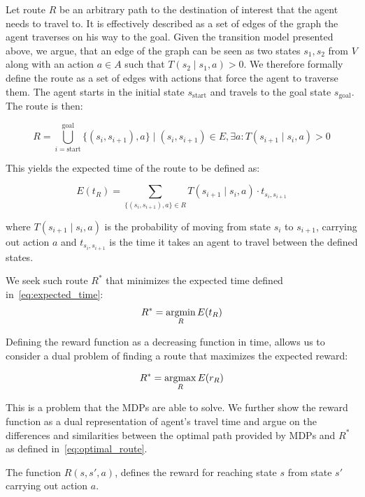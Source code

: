 Let route $R$ be an arbitrary path to the destination of interest that the
agent needs to travel to. It is effectively described as a set of edges of the
graph the agent traverses on his way to the goal. Given the transition model
presented above, we argue, that an edge of the graph can be seen as two states
$s_1, s_2$ from $V$ along with an action $a \in A$ such that $T(s_2 \mid s_1,
a) > 0$. We therefore formally define the route as a set of edges with actions
that force the agent to traverse them. The agent starts in the initial state
$s_\mathrm{start}$ and travels to the goal state $s_\mathrm{goal}$. The route
is then:

\begin{equation}
R = \bigcup_{i=\mathrm{start}}^{\mathrm{goal}} \{(s_i, s_{i+1}), a \} \mid (s_i, s_{i+1}) \in E, \exists a: T(s_{i+1} \mid s_i, a) > 0
\end{equation}

This yields the expected time of the route to be defined as:

\begin{equation}
\label{eq:expected_time}
E(t_R) = \sum_{\{(s_i, s_{i+1}), a \} \in R} T(s_{i+1} \mid s_i, a) \cdot t_{s_i, s_{i+1}}
\end{equation}

where $T(s_{i+1} \mid s_i, a)$ is the probability of moving from state $s_i$
to $s_{i+1}$, carrying out action $a$ and $t_{s_i, s_{i+1}}$ is the time it
takes an agent to travel between the defined states.

We seek such route $R^*$ that minimizes the expected time defined in~\eqref{eq:expected_time}:
\begin{equation}
\label{eq:optimal_route}
    R^* = \mathop{\rm argmin}_R E(t_R)
\end{equation}

Defining the reward function as a decreasing function in time, allows us to
consider a dual problem of finding a route that maximizes the expected reward:

\begin{equation}
    R^* = \mathop{\rm argmax}_R E(r_R)
\end{equation}

This is a problem that the MDPs are able to solve. We further show the reward
function as a dual representation of agent's travel time and argue on the
differences and similarities between the optimal path provided by MDPs and
$R^*$ as defined in~\eqref{eq:optimal_route}.

The function $R(s, s', a)$, defines the reward for reaching state $s$ from
state $s'$ carrying out action $a$.

